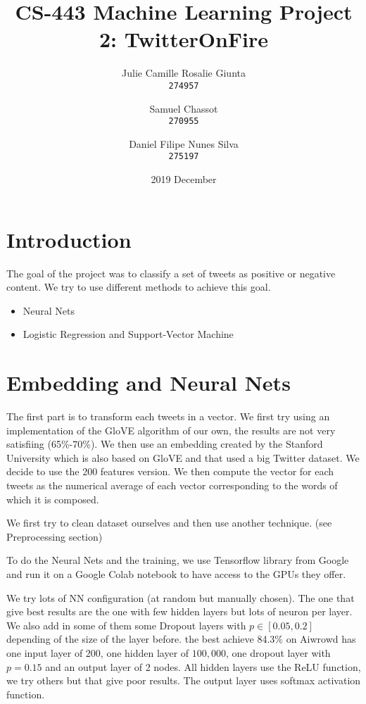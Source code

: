 \documentclass[11pt, a4paper, twocolumn]{article}
\begin{document}
\date{2019 December}
\title{CS-443 Machine Learning Project 2: TwitterOnFire}
\author{
  Julie Camille Rosalie Giunta\\
  \texttt{274957}
  \and
  Samuel Chassot\\
  \texttt{270955}
  \and
  Daniel Filipe Nunes Silva\\
  \texttt{275197}
}

\maketitle
\clearpage

\section{Introduction}
The goal of the project was to classify a set of tweets as positive or negative content. We try to use different methods to achieve this goal.

\begin{itemize}
  \item Neural Nets
	\item Logistic Regression and Support-Vector Machine
\end{itemize}

\section{Embedding and Neural Nets}
The first part is to transform each tweets in a vector. We first try using an implementation of the 
GloVE algorithm of our own, the results are not very satisfiing (65\%-70\%). We then use an embedding 
created by the Stanford University which is also based on GloVE and that used a big Twitter dataset. 
We decide to use the 200 features version.
We then compute the vector for each tweets as the numerical average of each vector corresponding to the 
words of which it is composed.

We first try to clean dataset ourselves and then use another technique. (see Preprocessing section) 

To do the Neural Nets and the training, we use Tensorflow library from Google and run it on a Google Colab notebook 
to have access to the GPUs they offer.

We try lots of NN configuration (at random but manually chosen). The one that give best results are the one with 
few hidden layers but lots of neuron per layer. We also add in some of them some Dropout layers with $p\in [0.05, 0.2]$ 
depending of the size of the layer before.
the best achieve 84.3\% on Aiwrowd has one input layer of $200$, one hidden layer of $100,000$, one dropout 
layer with $p=0.15$ and an output layer of 2 nodes. All hidden layers use the ReLU function, we try others 
but that give poor results. The output layer uses softmax activation function.
\end{document}
